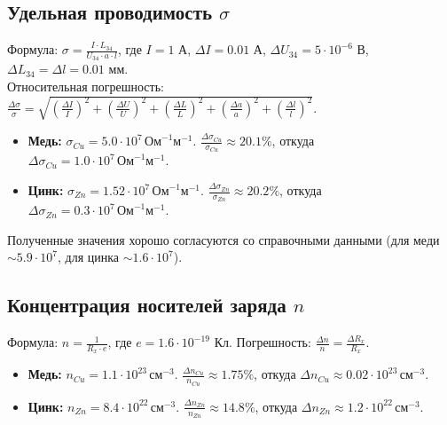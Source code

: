 \documentclass[a4paper,10pt]{article}
\begin{document}
\subsection*{Удельная проводимость \(\sigma\)}
Формула: \(\sigma = \frac{I \cdot L_{34}}{U_{34} \cdot a \cdot l}\), где \(I = 1\) А, \(\Delta I = 0.01\) А, \(\Delta U_{34} = 5 \cdot 10^{-6}\) В, \(\Delta L_{34} = \Delta l = 0.01\) мм.
\\
Относительная погрешность: \(\frac{\Delta \sigma}{\sigma} = \sqrt{(\frac{\Delta I}{I})^2 + (\frac{\Delta U}{U})^2 + (\frac{\Delta L}{L})^2 + (\frac{\Delta a}{a})^2 + (\frac{\Delta l}{l})^2}\).
\\
\begin{itemize}
    \item \textbf{Медь:} \(\sigma_{Cu} = 5.0 \cdot 10^7 \, \text{Ом}^{-1}\text{м}^{-1}\). 
    \(\frac{\Delta \sigma_{Cu}}{\sigma_{Cu}} \approx 20.1\%\), откуда \(\Delta \sigma_{Cu} = 1.0 \cdot 10^7 \, \text{Ом}^{-1}\text{м}^{-1}\).
    \item \textbf{Цинк:} \(\sigma_{Zn} = 1.52 \cdot 10^7 \, \text{Ом}^{-1}\text{м}^{-1}\). 
    \(\frac{\Delta \sigma_{Zn}}{\sigma_{Zn}} \approx 20.2\%\), откуда \(\Delta \sigma_{Zn} = 0.3 \cdot 10^7 \, \text{Ом}^{-1}\text{м}^{-1}\).
\end{itemize}
Полученные значения хорошо согласуются со справочными данными (для меди \(\sim 5.9 \cdot 10^7\), для цинка \(\sim 1.6 \cdot 10^7\)).

\subsection*{Концентрация носителей заряда \(n\)}
Формула: \(n = \frac{1}{R_x \cdot e}\), где \(e = 1.6 \cdot 10^{-19}\) Кл. 
Погрешность: \(\frac{\Delta n}{n} = \frac{\Delta R_x}{R_x}\).
\begin{itemize}
    \item \textbf{Медь:} \(n_{Cu} = 1.1 \cdot 10^{23} \, \text{см}^{-3}\). 
    \(\frac{\Delta n_{Cu}}{n_{Cu}} \approx 1.75\%\), откуда \(\Delta n_{Cu} \approx 0.02 \cdot 10^{23} \, \text{см}^{-3}\).
    \item \textbf{Цинк:} \(n_{Zn} = 8.4 \cdot 10^{22} \, \text{см}^{-3}\). 
    \(\frac{\Delta n_{Zn}}{n_{Zn}} \approx 14.8\%\), откуда \(\Delta n_{Zn} \approx 1.2 \cdot 10^{22} \, \text{см}^{-3}\). 
\end{itemize}
\end{document}
